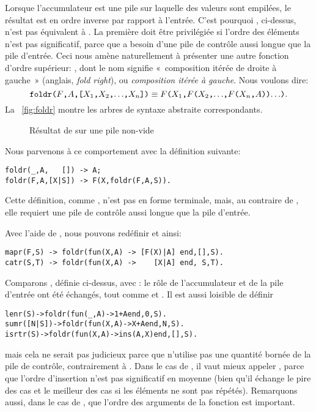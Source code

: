 Lorsque l'accumulateur est une pile sur laquelle des valeurs sont
empilées, le résultat est en ordre inverse par rapport à
l'entrée. C'est pourquoi , ci-dessus, n'est pas
équivalent à . La première doit être privilégiée si
l'ordre des éléments n'est pas significatif, parce que 
a besoin d'une pile de contrôle aussi longue que la pile
d'entrée. Ceci nous amène naturellement à présenter une autre fonction
d'ordre supérieur: , dont le nom signifie
«~composition itérée de droite à gauche~» (anglais, \emph{fold right}),
ou \emph{composition itérée à gauche}. Nous voulons dire:
\begin{equation*}
\texttt{foldr(\(F\),\(A\),[\(X_1\),\(X_2\),\(\ldots\),\(X_{n}\)])}
\equiv
\texttt{\(F\)(\(X_1\),\(F\)(\(X_2\),\(\ldots\),\(F\)(\(X_{n}\),\(A\)))\(\ldots\))}.
\end{equation*}
La \fig~\vref{fig:foldr} montre les arbres de syntaxe abstraite
correspondants.
\begin{figure}
\centering
{}
\qquad
{}
\caption{Résultat de  sur une pile non-vide}
\label{fig:foldr}
\end{figure}
Nous parvenons à ce comportement avec la définition suivante:
\begin{verbatim}
foldr(_,A,   []) -> A;
foldr(F,A,[X|S]) -> F(X,foldr(F,A,S)).
\end{verbatim}
Cette définition, comme , n'est pas en forme
terminale, mais, au contraire de , elle requiert une
pile de contrôle aussi longue que la pile d'entrée.

Avec l'aide de , nous pouvons redéfinir
 et  ainsi:
\begin{verbatim}
mapr(F,S) -> foldr(fun(X,A) -> [F(X)|A] end,[],S).
catr(S,T) -> foldr(fun(X,A) ->    [X|A] end, S,T).
\end{verbatim}
Comparons , définie ci-dessus, avec :
le rôle de l'accumulateur et de la pile d'entrée ont été échangés,
tout comme  et . Il est aussi
loisible de définir
\begin{alltt}
lenr(S)     -> foldr(fun(_,A) -> 1+A end, 0,S).\hfill% \emph{Mauvais}
sumr([N|S]) -> foldr(fun(X,A) -> X+A end, N,S).\hfill% \emph{Mauvais}
isrtr(S)    -> foldr(fun(X,A) -> ins(A,X) end,[],S).\hfill% \emph{Non}
\end{alltt}
mais cela ne serait pas judicieux parce que 
n'utilise pas une quantité bornée de la pile de contrôle,
contrairement à . Dans le cas de , il
vaut mieux appeler , parce que l'ordre d'insertion
n'est pas significatif en moyenne (bien qu'il échange le pire des cas
et le meilleur des cas si les éléments ne sont pas
répétés). Remarquons aussi, dans le cas de , que
l'ordre des arguments de la fonction  est important.

